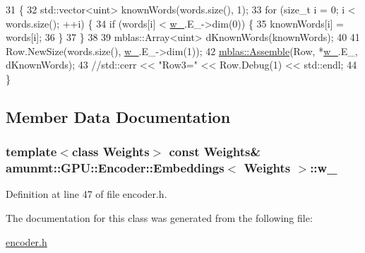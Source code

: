 \begin{DoxyCode}
31                                                           \{
32           std::vector<uint> knownWords(words.size(), 1);
33           \textcolor{keywordflow}{for} (\textcolor{keywordtype}{size\_t} i = 0; i < words.size(); ++i) \{
34             \textcolor{keywordflow}{if} (words[i] < \hyperlink{classamunmt_1_1GPU_1_1Encoder_1_1Embeddings_a17bf92e9d4b8683b51f28876a1f4b1eb}{w\_}.E\_->dim(0)) \{
35               knownWords[i] = words[i];
36             \}
37           \}
38 
39           mblas::Array<uint> dKnownWords(knownWords);
40 
41           Row.NewSize(words.size(), \hyperlink{classamunmt_1_1GPU_1_1Encoder_1_1Embeddings_a17bf92e9d4b8683b51f28876a1f4b1eb}{w\_}.E\_->dim(1));
42           \hyperlink{namespaceamunmt_1_1GPU_1_1mblas_a45e67b812840551fae28c4f7cca2b562}{mblas::Assemble}(Row, *\hyperlink{classamunmt_1_1GPU_1_1Encoder_1_1Embeddings_a17bf92e9d4b8683b51f28876a1f4b1eb}{w\_}.E\_, dKnownWords);
43           \textcolor{comment}{//std::cerr << "Row3=" << Row.Debug(1) << std::endl;}
44         \}
\end{DoxyCode}


\subsection{Member Data Documentation}
\subsubsection[{\texorpdfstring{w\+\_\+}{w_}}]{\setlength{\rightskip}{0pt plus 5cm}template$<$class Weights$>$ const {\bf Weights}\& {\bf amunmt\+::\+G\+P\+U\+::\+Encoder\+::\+Embeddings}$<$ {\bf Weights} $>$\+::w\+\_\+\hspace{0.3cm}{\ttfamily [private]}}\hypertarget{classamunmt_1_1GPU_1_1Encoder_1_1Embeddings_a17bf92e9d4b8683b51f28876a1f4b1eb}{}\label{classamunmt_1_1GPU_1_1Encoder_1_1Embeddings_a17bf92e9d4b8683b51f28876a1f4b1eb}


Definition at line 47 of file encoder.\+h.



The documentation for this class was generated from the following file\+:\begin{DoxyCompactItemize}
\item 
\hyperlink{encoder_8h}{encoder.\+h}\end{DoxyCompactItemize}
